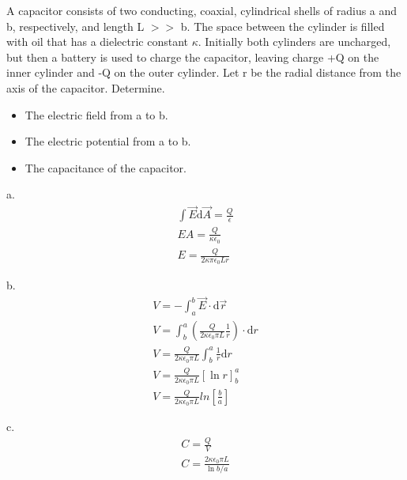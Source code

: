 \documentclass[../em.tex]{subfiles}
\begin{document}
\begin{example}
    A capacitor consists of two conducting, coaxial, cylindrical shells of radius a and b, respectively,
    and length L $>>$ b. The space between the cylinder is filled with oil that has a dielectric constant $\kappa$.
    Initially both cylinders are uncharged, but then a battery is used to charge the capacitor, leaving charge +Q 
    on the inner cylinder and -Q on the outer cylinder. Let r be the radial distance from the axis of the capacitor.
    Determine.
    \begin{itemize}
        \item The electric field from a to b.
        \item The electric potential from a to b.
        \item The capacitance of the capacitor.
    \end{itemize}

    a.
    \begin{align*}
        \int \vec{E}\mathrm{d}\vec{A}=\frac{Q}{\epsilon}\\ 
        EA = \frac{Q}{\kappa\epsilon_0}\\
        E = \frac{Q}{2\kappa \pi\epsilon_0 L r}
    \end{align*} 

    b.
    \begin{align*}
        V = -\int_a^b \vec{E}\cdot\mathrm{d}\vec{r}\\
        V = \int^a_b \left(\frac{Q}{2\kappa\epsilon_0 \pi L}\frac{1}{r}\right)\cdot \mathrm{d}r\\
        V = \frac{Q}{2\kappa\epsilon_0\pi L}\int_b^a \frac{1}{r}\mathrm{d}r\\
        V = \frac{Q}{2\kappa\epsilon_0\pi L}[\ln r]^a_b \\
        V = \frac{Q}{2\kappa\epsilon_0\pi L}ln\left[\frac{b}{a}\right]
    \end{align*}

    c.
    \begin{align*}
        C = \frac{Q}{V}\\
        C = \frac{2\kappa \epsilon_0 \pi L}{\ln b/a}
    \end{align*}

\end{example}
\end{document}
